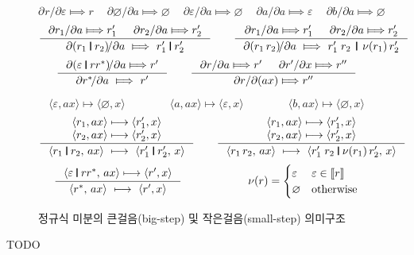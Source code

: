 \documentclass[b5paper,chapter,figtabcapt]{oblivoir}
\newcommand{\VERT}{\ensuremath{\mathop{\!\resizebox{1.65ex}{.7em}{\texttt{|}}\!}}}
\begin{document}
\begin{figure}
\[
\partial_{}r/\partial\varepsilon \Longmapsto r
\quad~
\partial\varnothing\!/\partial a \Longmapsto \varnothing
\quad~
\partial\varepsilon/\partial a \Longmapsto \varnothing
\quad~
\partial a/\partial a \Longmapsto \varepsilon
\quad~
\partial b/\partial a \Longmapsto \varnothing
\]
\[
\inference{ \partial_{}r_1/\partial a \Longmapsto r_1'
          & \partial_{}r_2/\partial a \Longmapsto r_2' }{
            \partial(r_1 \VERT r_2)\!/\partial a
            ~\Longmapsto~ r_1'\VERT r_2'}
\qquad
\inference{ \partial_{}r_1/\partial a \Longmapsto r_1'
          & \partial_{}r_2/\partial a \Longmapsto r_2' }{
            \partial(r_1\,r_2)\!/\partial a
            ~\Longmapsto~ r_1'\;r_2 \,\VERT\,\nu(r_1)\,r_2'}
\]
\[
\inference{
   \partial(\varepsilon \VERT rr^{*})\!/\partial a \Longmapsto r' }{
   \partial_{}r^{*}\!/\partial a ~\Longmapsto~ r' }
\qquad
\inference{ \partial_{}r/\partial a \Longmapsto r'
          & \partial_{}r'/\partial x \Longmapsto r'' }{
            \partial_{}r/\partial(ax) \Longmapsto r''}
\]

\[
\langle \varepsilon,ax\rangle \longmapsto \langle \varnothing,x\rangle
\qquad\qquad
\langle a,ax\rangle \longmapsto \langle \varepsilon,x\rangle
\qquad\qquad
\langle b,ax\rangle \longmapsto \langle \varnothing,x\rangle
\]
\[
\inference{ \langle r_1, ax\rangle \longmapsto \langle r_1',x \rangle
         \\ \langle r_2, ax\rangle \longmapsto \langle r_2',x \rangle }{
            \langle r_1 \VERT r_2,\,ax \rangle 
            ~\longmapsto~ \langle r_1' \VERT r_2',\, x \rangle }
\qquad
\inference{ \langle r_1, ax\rangle \longmapsto \langle r_1',x \rangle
         \\ \langle r_2, ax\rangle \longmapsto \langle r_2',x \rangle }{
            \langle r_1\,r_2,\, ax\rangle
            ~\longmapsto~ \langle r_1'\;r_2 \VERT \nu(r_1)\,r_2',\,x\rangle }
\]
\[
\inference{
   \langle \varepsilon \VERT rr^{*},\, ax \rangle \longmapsto \langle r',x\rangle }{
   \langle r^{*},\, ax\rangle ~\longmapsto~ \langle r',x\rangle }
\qquad\qquad\qquad
\nu(r) = \begin{cases}
          \varepsilon & \varepsilon \in \llbracket r \rrbracket \\
          \varnothing & \text{otherwise}
         \end{cases}
\]
\caption{정규식 미분의 큰걸음(big-step) 및 작은걸음(small-step) 의미구조}
\end{figure}

TODO
\end{document}
